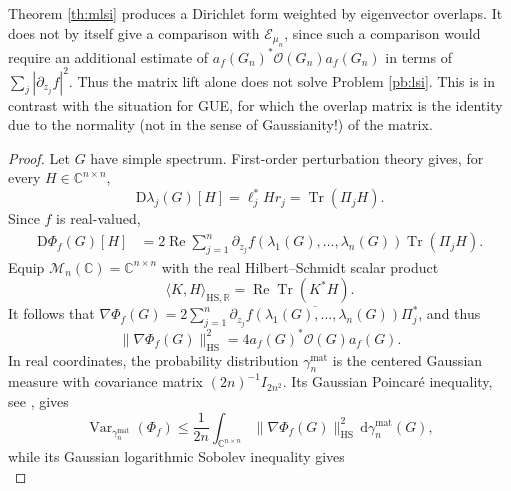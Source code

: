 \documentclass[11pt,reqno]{amsart}
\numberwithin{equation}{section}%
\numberwithin{figure}{section}%
\numberwithin{table}{section}
\theoremstyle{plain}
\theoremstyle{definition}
\begin{document}
Theorem \ref{th:mlsi} produces a Dirichlet form weighted by eigenvector
overlaps. It does not by itself give a comparison with $\mathcal{E}_{\mu_n}$,
since such a comparison would require an additional estimate of
$a_f(G_n)^*\mathcal{O}(G_n)a_f(G_n)$ in terms of $\sum_j|\partial_{z_j}f|^2$.
Thus the matrix lift alone does not solve Problem \ref{pb:lsi}. This is in
contrast with the situation for GUE, for which the overlap matrix is the
identity due to the normality (not in the sense of Gaussianity!) of the
matrix.

\begin{proof}
  Let $G$ have simple spectrum. First-order perturbation theory gives, for
  every $H\in\mathbb{C}^{n\times n}$,
  \begin{equation}\label{eq:eigenvalue-differential}
    \mathrm{D}\lambda_j(G)[H]
    =
    \ell_j^*Hr_j
    =
    \operatorname{Tr}(\Pi_jH).
  \end{equation}
  Since $f$ is real-valued,
  \begin{align}
    \mathrm{D}\Phi_f(G)[H]
    &=
    2\operatorname{Re}
    \sum_{j=1}^n
    \partial_{z_j}f(\lambda_1(G),\ldots,\lambda_n(G))
    \operatorname{Tr}(\Pi_jH).
  \end{align}
  Equip $\mathcal{M}_n(\mathbb{C})=\mathbb{C}^{n\times n}$ with the real
  Hilbert--Schmidt scalar product
  \[
    \langle K,H\rangle_{\mathrm{HS},\mathbb{R}}
    =
    \operatorname{Re}\operatorname{Tr}(K^*H).
  \]
  It follows that
  $\nabla\Phi_f(G)=2\sum_{j=1}^n\overline{\partial_{z_j}f(\lambda_1(G),\ldots,\lambda_n(G))}\Pi_j^*$,
  and thus
  \begin{equation}\label{eq:matrix-lift-gradient}
    \|\nabla\Phi_f(G)\|_{\mathrm{HS}}^2
    =
    4a_f(G)^*\mathcal{O}(G)a_f(G).
  \end{equation}
  In real coordinates, the probability distribution $\gamma_n^{\mathrm{mat}}$
  is the centered Gaussian measure with covariance matrix $(2n)^{-1}I_{2n^2}$.
  Its Gaussian Poincaré inequality, see
  \cite[Ch.~5]{BakryPolynomialEigenvectors}, gives
  \begin{equation}
    \operatorname{Var}_{\gamma_n^{\mathrm{mat}}}(\Phi_f)
    \leq
    \frac{1}{2n}
    \int_{\mathbb{C}^{n\times n}}
    \|\nabla\Phi_f(G)\|_{\mathrm{HS}}^2
    \,\mathrm{d}\gamma_n^{\mathrm{mat}}(G),
  \end{equation}
  while its Gaussian logarithmic Sobolev inequality gives
  \begin{equation}

\end{equation}
\end{proof}
\end{document}
